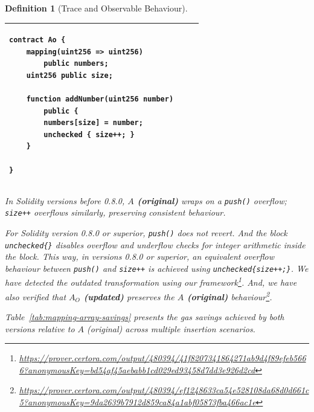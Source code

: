 \documentclass[manuscript,screen,review]{acmart}
\newtheorem{definition}{Definition}
\begin{document}
\begin{definition}[Trace and Observable Behaviour]
\begin{table}[htb]
\begin{tabular}{|p{}|p{}|p{}|}
\begin{verbatim}
contract Ao {
    mapping(uint256 => uint256) 
        public numbers;
    uint256 public size;
    
    function addNumber(uint256 number) 
        public {
        numbers[size] = number;
        unchecked { size++; }
    }
    
}
\end{verbatim}
\\ \hline
\end{tabular}
\end{table}

In Solidity versions before 0.8.0, {\bf $A$ (original)} wraps on a \texttt{push()} overflow; \texttt{size++} overflows similarly, preserving consistent behaviour.

For Solidity version 0.8.0 or superior, \texttt{push()} does not revert. And the block \texttt{unchecked\{\}} disables overflow and underflow checks for integer arithmetic inside the block. This way, in versions 0.8.0 or superior, an equivalent overflow behaviour between \texttt{push()} and \texttt{size++} is achieved using \texttt{unchecked\{size++;\}}. We have detected the outdated transformation using our framework\footnote{\url{https://prover.certora.com/output/480394/41f8207341864271ab9d4f89efeb5666?anonymousKey=bd54af45aebabb1cd029ed93458d7dd3e926d2cd}}. And, we have also verified that {\bf $A_O$ (updated)} preserves the {\bf $A$ (original)} behaviour\footnote{\url{https://prover.certora.com/output/480394/ef1248633ca54e528108da68d0d661c5?anonymousKey=9da2639b7912d859ca84a1abf05873fba466ac1e}}.

Table~\ref{tab:mapping-array-savings} presents the gas savings achieved by both versions relative to $A$ (original) across multiple insertion scenarios.


\end{definition}
\end{document}
